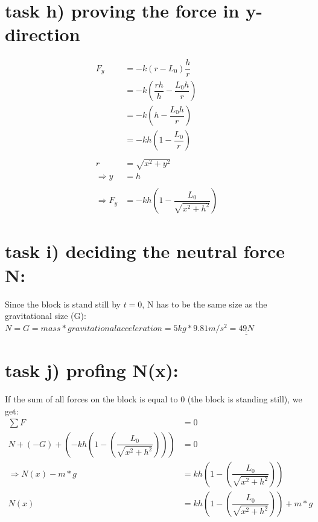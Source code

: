\documentclass{article}
\begin{document}
    \section*{task h) proving the force in y-direction }
    \begin{equation*}
        \begin{split}
            F_y &= -k(r-L_0)\dfrac{h}{r} \\
                &= -k(\dfrac{rh}{h}-\dfrac{L_0h}{r}) \\
                &= -k(h-\dfrac{L_0h}{r}) \\
                &= -kh(1-\dfrac{L_0}{r}) \\
                \\
                r &= \sqrt{x^2 + y^2} \\
                \Rightarrow y &= h \\
                \\
                \Rightarrow F_y &= -kh(1-\dfrac{L_0}{\sqrt{x^2+h^2}})
        \end{split}
    \end{equation*}

    \section*{task i) deciding the neutral force N: }
    Since the block is stand still by \(t = 0 \), N has to be the same size as the gravitational size (G): \linebreak
    \(N = G = mass * gravitational acceleration = 5kg * 9.81m/s^2 = \underline{\underline{49N}}\)

    \section*{task j) profing N(x): }
    If the sum of all forces on the block is equal to 0 (the block is standing still), we get:
    \begin{equation*}
        \begin{split}
            \sum{F} &= 0 \\
            N + (-G) + (-kh(1-(\dfrac{L_0}{\sqrt{x^2+h^2}}))) &= 0 \\
            \Rightarrow N(x) - m*g &= kh(1-(\dfrac{L_0}{\sqrt{x^2+h^2}})) \\
            N(x) &= kh(1-(\dfrac{L_0}{\sqrt{x^2+h^2}})) + m*g
        \end{split}
    \end{equation*}
\end{document}
